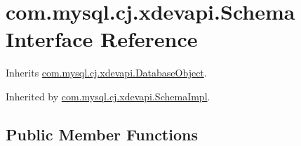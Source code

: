 \hypertarget{interfacecom_1_1mysql_1_1cj_1_1xdevapi_1_1_schema}{}\section{com.\+mysql.\+cj.\+xdevapi.\+Schema Interface Reference}
\label{interfacecom_1_1mysql_1_1cj_1_1xdevapi_1_1_schema}


Inherits \mbox{\hyperlink{interfacecom_1_1mysql_1_1cj_1_1xdevapi_1_1_database_object}{com.\+mysql.\+cj.\+xdevapi.\+Database\+Object}}.



Inherited by \mbox{\hyperlink{classcom_1_1mysql_1_1cj_1_1xdevapi_1_1_schema_impl}{com.\+mysql.\+cj.\+xdevapi.\+Schema\+Impl}}.

\subsection*{Public Member Functions}
